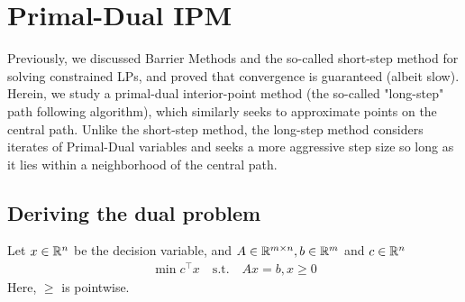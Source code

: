 \section{Primal-Dual IPM}
Previously, we discussed Barrier Methods and the so-called short-step method for solving constrained LPs, and proved that convergence is guaranteed (albeit slow). Herein, we study a primal-dual interior-point method (the so-called "long-step"  path following algorithm), which similarly seeks to approximate points on the central path. Unlike the short-step method, the long-step method considers iterates of Primal-Dual variables and seeks a more aggressive step size so long as it lies within a neighborhood of the central path.



\subsection{Deriving the dual problem}

Let $x \in \mathbb{R}^n$ be the decision variable, and $A \in \mathbb{R}^{m \times n},b \in \mathbb{R}^m$ and $c \in \mathbb{R}^n$
\begin{eqnarray*}
\min c^\top x \quad \text{s.t.}\quad Ax = b, x \ge 0 
\end{eqnarray*}
Here, $\ge$ is pointwise.

